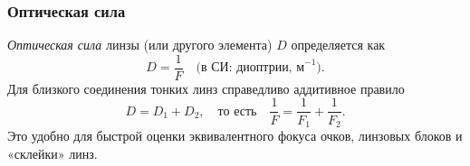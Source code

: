 \documentclass[12pt, a4paper]{article}%
\begin{document}
\subsubsection*{Оптическая сила }
\textit{Оптическая сила} линзы (или другого элемента) \(D\) определяется как
\[
D=\frac{1}{F}\quad\text{(в СИ: диоптрии, м}^{-1}).
\]
Для близкого соединения тонких линз справедливо аддитивное правило
\[
D=D_1+D_2,\quad\text{то есть}\quad \frac{1}{F}=\frac{1}{F_1}+\frac{1}{F_2}.
\]
Это удобно для быстрой оценки эквивалентного фокуса очков, линзовых блоков и «склейки» линз.
\end{document}
